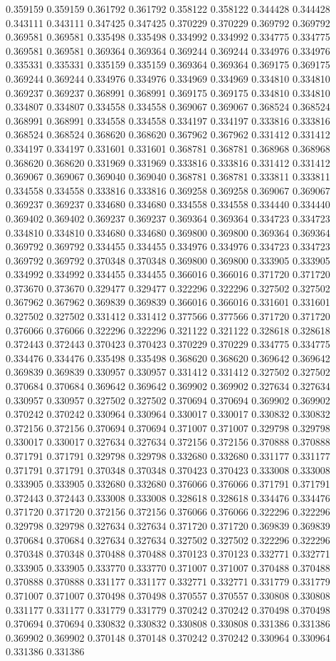 0.359159 0.359159 0.361792 0.361792 0.358122 0.358122 0.344428 0.344428 0.343111 0.343111 0.347425 0.347425 0.370229 0.370229 0.369792 0.369792 0.369581 0.369581 0.335498 0.335498 0.334992 0.334992 0.334775 0.334775 0.369581 0.369581 0.369364 0.369364 0.369244 0.369244 0.334976 0.334976 0.335331 0.335331 0.335159 0.335159 0.369364 0.369364 0.369175 0.369175 0.369244 0.369244 0.334976 0.334976 0.334969 0.334969 0.334810 0.334810 0.369237 0.369237 0.368991 0.368991 0.369175 0.369175 0.334810 0.334810 0.334807 0.334807 0.334558 0.334558 0.369067 0.369067 0.368524 0.368524 0.368991 0.368991 0.334558 0.334558 0.334197 0.334197 0.333816 0.333816 0.368524 0.368524 0.368620 0.368620 0.367962 0.367962 0.331412 0.331412 0.334197 0.334197 0.331601 0.331601 0.368781 0.368781 0.368968 0.368968 0.368620 0.368620 0.331969 0.331969 0.333816 0.333816 0.331412 0.331412 0.369067 0.369067 0.369040 0.369040 0.368781 0.368781 0.333811 0.333811 0.334558 0.334558 0.333816 0.333816 0.369258 0.369258 0.369067 0.369067 0.369237 0.369237 0.334680 0.334680 0.334558 0.334558 0.334440 0.334440 0.369402 0.369402 0.369237 0.369237 0.369364 0.369364 0.334723 0.334723 0.334810 0.334810 0.334680 0.334680 0.369800 0.369800 0.369364 0.369364 0.369792 0.369792 0.334455 0.334455 0.334976 0.334976 0.334723 0.334723 0.369792 0.369792 0.370348 0.370348 0.369800 0.369800 0.333905 0.333905 0.334992 0.334992 0.334455 0.334455 0.366016 0.366016 0.371720 0.371720 0.373670 0.373670 0.329477 0.329477 0.322296 0.322296 0.327502 0.327502 0.367962 0.367962 0.369839 0.369839 0.366016 0.366016 0.331601 0.331601 0.327502 0.327502 0.331412 0.331412 0.377566 0.377566 0.371720 0.371720 0.376066 0.376066 0.322296 0.322296 0.321122 0.321122 0.328618 0.328618 0.372443 0.372443 0.370423 0.370423 0.370229 0.370229 0.334775 0.334775 0.334476 0.334476 0.335498 0.335498 0.368620 0.368620 0.369642 0.369642 0.369839 0.369839 0.330957 0.330957 0.331412 0.331412 0.327502 0.327502 0.370684 0.370684 0.369642 0.369642 0.369902 0.369902 0.327634 0.327634 0.330957 0.330957 0.327502 0.327502 0.370694 0.370694 0.369902 0.369902 0.370242 0.370242 0.330964 0.330964 0.330017 0.330017 0.330832 0.330832 0.372156 0.372156 0.370694 0.370694 0.371007 0.371007 0.329798 0.329798 0.330017 0.330017 0.327634 0.327634 0.372156 0.372156 0.370888 0.370888 0.371791 0.371791 0.329798 0.329798 0.332680 0.332680 0.331177 0.331177 0.371791 0.371791 0.370348 0.370348 0.370423 0.370423 0.333008 0.333008 0.333905 0.333905 0.332680 0.332680 0.376066 0.376066 0.371791 0.371791 0.372443 0.372443 0.333008 0.333008 0.328618 0.328618 0.334476 0.334476 0.371720 0.371720 0.372156 0.372156 0.376066 0.376066 0.322296 0.322296 0.329798 0.329798 0.327634 0.327634 0.371720 0.371720 0.369839 0.369839 0.370684 0.370684 0.327634 0.327634 0.327502 0.327502 0.322296 0.322296 0.370348 0.370348 0.370488 0.370488 0.370123 0.370123 0.332771 0.332771 0.333905 0.333905 0.333770 0.333770 0.371007 0.371007 0.370488 0.370488 0.370888 0.370888 0.331177 0.331177 0.332771 0.332771 0.331779 0.331779 0.371007 0.371007 0.370498 0.370498 0.370557 0.370557 0.330808 0.330808 0.331177 0.331177 0.331779 0.331779 0.370242 0.370242 0.370498 0.370498 0.370694 0.370694 0.330832 0.330832 0.330808 0.330808 0.331386 0.331386 0.369902 0.369902 0.370148 0.370148 0.370242 0.370242 0.330964 0.330964 0.331386 0.331386 